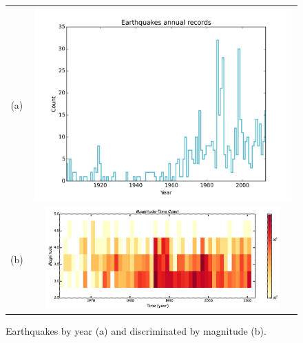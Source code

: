 \documentclass[grl]{agutex}
\begin{document}
\begin{figure}
	\begin{center}
	\begin{table}[H]
		\begin{tabular}{ c c }
		\footnotesize(a)
		& \includegraphics[width=0.99\textwidth]{z_img_hmtk_bsb2014_11_rate}
		\\
		\footnotesize(b)
		& \includegraphics[width=0.90\textwidth]{z_img_time_mag_count_br_1960}
		\end{tabular}
	\end{table}
	\caption{Earthquakes by year (a) and discriminated by magnitude (b).}
	\label{fig_records}
	\end{center}
\end{figure}
\end{document}
